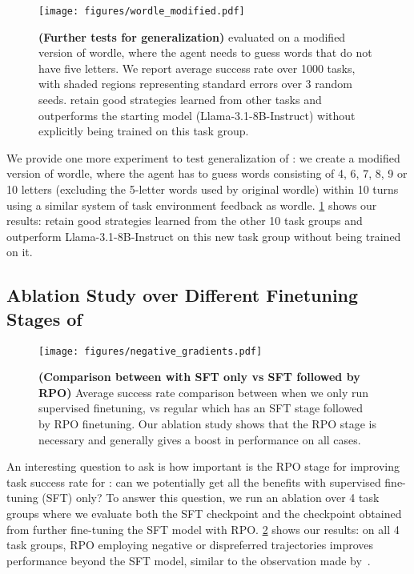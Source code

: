 \begin{figure}[h!]
    \centering
    \texttt{[image: figures/wordle\_modified.pdf]}
    \caption{\textbf{(Further tests for generalization)} \ours{} evaluated on a modified version of wordle, where the agent needs to guess words that do not have five letters. We report average success rate over 1000 tasks, with shaded regions representing standard errors over 3 random seeds. \ours{} retain good strategies learned from other tasks and outperforms the starting model (Llama-3.1-8B-Instruct) without explicitly being trained on this task group.}
    \label{fig:wordle_modified}
\end{figure}

We provide one more experiment to test generalization of \ours{}: we create a modified version of wordle, where the agent has to guess words consisting of 4, 6, 7, 8, 9 or 10 letters (excluding the 5-letter words used by original wordle) within 10 turns using a similar system of task environment feedback as wordle. \cref{fig:wordle_modified} shows our results: \ours{} retain good strategies learned from the other 10 task groups and outperform Llama-3.1-8B-Instruct on this new task group without being trained on it.

\subsection{Ablation Study over Different Finetuning Stages of \ours{}}

\begin{figure}[h!]
    \centering
    \texttt{[image: figures/negative\_gradients.pdf]}
    \caption{\textbf{(Comparison between \ours{} with SFT only vs SFT followed by RPO)} Average success rate comparison between \ours{} when we only run supervised finetuning, vs regular \ours{} which has an SFT stage followed by RPO finetuning. Our ablation study shows that the RPO stage is necessary and generally gives a boost in performance on all cases.}
    \label{fig:sft_vs_rpo}
\end{figure}

An interesting question to ask is how important is the RPO stage for improving task success rate for \ours{}: can we potentially get all the benefits with supervised fine-tuning (SFT) only? To answer this question, we run an ablation over 4 task groups where we evaluate both the SFT checkpoint and the checkpoint obtained from further fine-tuning the SFT model with RPO. \cref{fig:sft_vs_rpo} shows our results: on all 4 task groups, RPO employing negative or dispreferred trajectories improves performance beyond the SFT model, similar to the observation made by~\citet{tajwar2024preferencefinetuningllmsleverage}.

